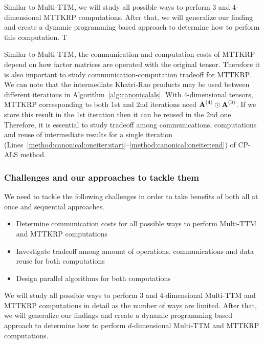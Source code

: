 \documentclass[a4paper,11pt]{article}
\begin{document}
	
	
	
	Similar to Multi-TTM, we will study all possible ways to perform $3$ and $4$-dimensional MTTKRP computations. After that, we will generalize our finding and create a dynamic programming based approach to determine how to perform this computation. T
	
	Similar to Multi-TTM, the communication and computation costs of  MTTKRP  depend on how factor matrices are operated with the original tensor. Therefore it is also important to study communication-computation tradeoff for MTTKRP. We can note that the intermediate Khatri-Rao products may be used between different iterations in Algorithm~\ref{alg:canonicalals}. With 4-dimensional tensors, MTTKRP corresponding to both 1st and 2nd iterations need $\Mn{A}{4}\odot\Mn{A}{3}$. If we store this result in the 1st iteration then it can be reused in the 2nd one. Therefore, it is essential to study tradeoff among communications, computations and reuse of intermediate results for a single iteration (Lines~\ref{method:canonical:oneiter:start}--\ref{method:canonical:oneiter:end}) of CP-ALS method.
	
	
	
	\subsubsection{Challenges and our approaches to tackle them}
	We need to tackle the following challenges in order to take benefits of both all at once and sequential approaches.
	\begin{itemize}
		\item Determine communication costs for all possible ways to perform Multi-TTM and MTTKRP  computations
		\item Investigate tradeoff among amount of operations, communications and data reuse for both computations
		\item Design parallel algorithms for both computations
	\end{itemize}
	
	
	We will study all possible ways to perform $3$ and $4$-dimensional Multi-TTM and MTTKRP computations in detail as the number of ways are limited. After that, we will generalize our findings and create a dynamic programming based approach to determine how to perform $d$-dimensional Multi-TTM and MTTKRP computations.
	
\end{document}
